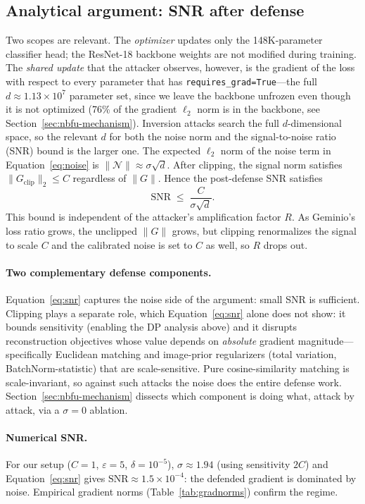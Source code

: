 \documentclass[11pt]{article}
\begin{document}
\subsection{Analytical argument: SNR after defense}
\label{sec:snr}
Two scopes are relevant. The \emph{optimizer} updates only the 148K-parameter classifier head; the ResNet-18 backbone weights are not modified during training. The \emph{shared update} that the attacker observes, however, is the gradient of the loss with respect to every parameter that has \texttt{requires\_grad=True}---the full $d\approx 1.13{\times}10^{7}$ parameter set, since we leave the backbone unfrozen even though it is not optimized (76\% of the gradient $\ell_2$ norm is in the backbone, see Section~\ref{sec:nbfu-mechanism}). Inversion attacks search the full $d$-dimensional space, so the relevant $d$ for both the noise norm and the signal-to-noise ratio (SNR) bound is the larger one. The expected $\ell_2$ norm of the noise term in Equation~\ref{eq:noise} is $\|\mathcal{N}\| \approx \sigma\sqrt{d}$. After clipping, the signal norm satisfies $\|G_{\text{clip}}\|_2 \le C$ regardless of $\|G\|$. Hence the post-defense SNR satisfies
\begin{equation}
\mathrm{SNR} \;\le\; \frac{C}{\sigma\sqrt{d}}.
\label{eq:snr}
\end{equation}
This bound is independent of the attacker's amplification factor $R$. As Geminio's loss ratio grows, the unclipped $\|G\|$ grows, but clipping renormalizes the signal to scale $C$ and the calibrated noise is set to $C$ as well, so $R$ drops out.

\paragraph{Two complementary defense components.}
Equation~\ref{eq:snr} captures the noise side of the argument: small SNR is sufficient. Clipping plays a separate role, which Equation~\ref{eq:snr} alone does not show: it bounds sensitivity (enabling the DP analysis above) and it disrupts reconstruction objectives whose value depends on \emph{absolute} gradient magnitude---specifically Euclidean matching and image-prior regularizers (total variation, BatchNorm-statistic) that are scale-sensitive. Pure cosine-similarity matching is scale-invariant, so against such attacks the noise does the entire defense work. Section~\ref{sec:nbfu-mechanism} dissects which component is doing what, attack by attack, via a $\sigma{=}0$ ablation.

\paragraph{Numerical SNR.}
For our setup ($C{=}1$, $\varepsilon{=}5$, $\delta{=}10^{-5}$), $\sigma \approx 1.94$ (using sensitivity $2C$) and Equation~\ref{eq:snr} gives $\mathrm{SNR} \approx 1.5{\times}10^{-4}$: the defended gradient is dominated by noise. Empirical gradient norms (Table~\ref{tab:gradnorms}) confirm the regime.
\end{document}
